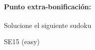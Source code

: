 \documentclass[fleqn]{article}
\begin{document}
 \paragraph*{Punto extra-bonificación:} Solucione el siguiente sudoku
 \cluefont{\Large}
 \renewcommand*{\puzzlefile}{se5.sud}
\begin{center}
\begin{minipage}{0.45\linewidth}\begin{center}
SE15 (easy) \\
\end{center}\end{minipage}
\end{center}
\end{document}
